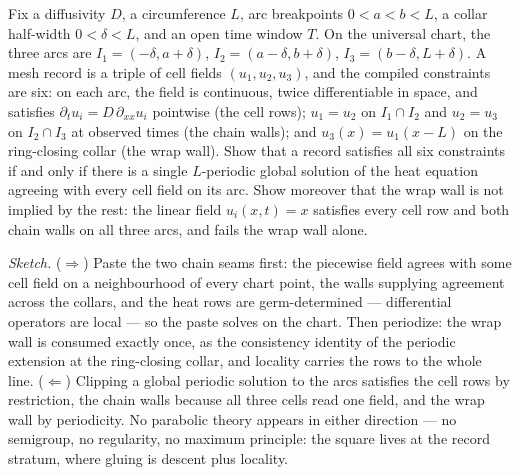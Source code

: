 \begin{problem}
\label{prob:mt-pde-heat}
Fix a diffusivity $D$, a circumference $L$, arc
breakpoints $0 < a < b < L$, a collar half-width $0 < \delta < L$,
and an open time window $T$.  On the universal chart, the three arcs
are $I_1 = (-\delta, a+\delta)$, $I_2 = (a-\delta, b+\delta)$,
$I_3 = (b-\delta, L+\delta)$.  A mesh record is a triple of cell
fields $(u_1, u_2, u_3)$, and the compiled constraints are six: on
each arc, the field is continuous, twice differentiable in space,
and satisfies $\partial_t u_i = D\,\partial_{xx} u_i$ pointwise (the
cell rows); $u_1 = u_2$ on $I_1 \cap I_2$ and $u_2 = u_3$ on
$I_2 \cap I_3$ at observed times (the chain walls); and
$u_3(x) = u_1(x - L)$ on the ring-closing collar (the wrap wall).
Show that a record satisfies all six constraints if and only if
there is a single $L$-periodic global solution of the heat equation
agreeing with every cell field on its arc.  Show moreover that the
wrap wall is not implied by the rest: the linear field
$u_i(x,t) = x$ satisfies every cell row and both chain walls on all
three arcs, and fails the wrap wall alone.
\end{problem}

\emph{Sketch.}  ($\Rightarrow$)  Paste the two chain seams first:
the piecewise field agrees with some cell field on a neighbourhood
of every chart point, the walls supplying agreement across the
collars, and the heat rows are germ-determined --- differential
operators are local --- so the paste solves on the chart.  Then
periodize: the wrap wall is consumed exactly once, as the
consistency identity of the periodic extension at the ring-closing
collar, and locality carries the rows to the whole line.
($\Leftarrow$) Clipping a global periodic solution to the arcs
satisfies the cell rows by restriction, the chain walls because all
three cells read one field, and the wrap wall by periodicity.  No
parabolic theory appears in either direction --- no semigroup, no
regularity, no maximum principle: the square lives at the record
stratum, where gluing is descent plus locality.

